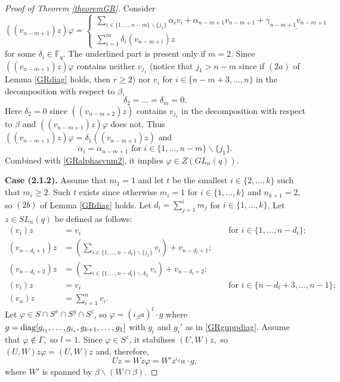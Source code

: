\begin{proof}[Proof of Theorem {\rm \ref{theoremGR}}]
Consider 
\begin{equation*}((v_{n-m+1})z) \varphi=
\begin{cases}
\underset{i \in \{1, \ldots, n-m\} \backslash \{j_1\}}{\sum} \alpha_i v_i + \alpha_{n-m+1} v_{n-m+1} +\underline{\gamma_{n-m+1} v_{n-m+1}}\\
\sum_{i=1}^m \delta_i (v_{n-m+i})z
\end{cases}
\end{equation*}
for some $\delta_i \in \mathbb{F}_q.$ The underlined part is present only if $m=2.$ Since $((v_{n-m+1})z) \varphi$ contains neither $v_{j_1}$ (notice that $j_1>n-m$ since if $(2a)$ of Lemma \ref{GRdiag} holds, then $r \ge 2$) nor $v_i$ for $i \in \{n-m+3, \ldots, n\}$ in the decomposition with respect to $\beta$, 
$$\delta_2 = \ldots = \delta_m =0.$$
Here $\delta_2=0$ since $((v_{n-m+2})z) $ contains $v_{j_1}$ in the decomposition with respect to $\beta$ and $((v_{n-m+1})z)\varphi$ does not.
Thus $((v_{n-m+1})z) \varphi= \delta_1 ((v_{n-m+1})z)$ and 
$$\alpha_i = \alpha_{n-m+1} \text{ for } i \in \{1, \ldots, n-m\} \backslash \{j_1\}.$$
Combined with \eqref{GRalphasvnm2}, it implies $\varphi \in Z(GL_n(q)).$ 

\medskip

{\bf Case (2.1.2).} Assume that $m_1=1$ and let $t$ be the smallest $i \in \{2, \ldots, k\}$ such that $m_i\ge 2.$ Such $t$ exists since otherwise $m_i=1$ for $i \in \{1, \ldots, k\}$ and $n_{k+1}=2,$ so $(2b)$ of Lemma \ref{GRdiag} holds. Let $d_i=\sum_{j=1}^i m_j$ for $i \in \{1, \ldots, k\}$. Let $z \in SL_n(q)$ be defined as follows:
\begin{equation}
\label{GRzdefq23mr}
\begin{aligned}
(v_i)z & =  v_i &&\text{ for } i \in \{1, \ldots, n-d_t\}; \\
(v_{n-d_t+1})z & =  \left(\underset{i \in \{1, \ldots, n-d_t\} \backslash \{j_1\}}{\sum} v_i \right) + v_{n-d_t+1};\\
(v_{n-d_t+2})z & =  \left(\underset{i \in \{1, \ldots, n-d_t\} \backslash \Lambda_2}{\sum} v_i \right)   + v_{n-d_t+2};\\
(v_i)z & =  v_i && \text{ for } i \in \{n-d_{t}+3, \ldots, n-1\};\\
(v_n)z & =  \sum_{i=1}^n v_i.
\end{aligned} 
\end{equation}
 Let $\varphi \in S \cap S^x \cap S^y \cap S^z$, so $\varphi= (\iota_{\beta}a)^l \cdot g$ where $g=\mathrm{diag}[g_{i_1},\ldots, g_{i_s}, g_{k+1}, \ldots, g_1]$ with $g_i$ and $g_i'$  as in \eqref{GRguppdiag}.  
 Assume that $\varphi \notin \Gamma,$ so $l=1.$ Since $\varphi \in S^z$, it stabilises $(U,W)z,$ so $(U,W)z \varphi =(U,W)z$ and, therefore, 
$$Uz=Wz \varphi = W'z^{\iota_{\beta}}a \cdot g,$$
where $W'$ is spanned by $\beta \backslash (W \cap \beta).$  


\end{proof}
